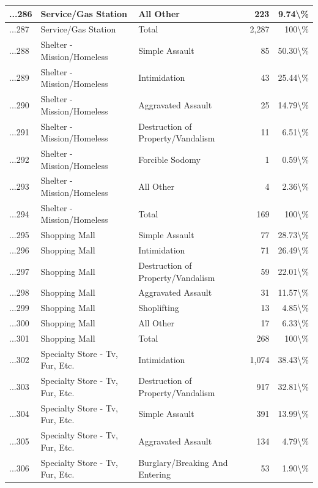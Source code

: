 \documentclass[
]{krantz}
\begin{document}
\begin{longtable}[t]{l|l|l|r|r}
\hline
...286 & Service/Gas Station & All Other & 223 & 9.74\textbackslash{}\%\\
\hline
...287 & Service/Gas Station & Total & 2,287 & 100\textbackslash{}\%\\
\hline
...288 & Shelter - Mission/Homeless & Simple Assault & 85 & 50.30\textbackslash{}\%\\
\hline
...289 & Shelter - Mission/Homeless & Intimidation & 43 & 25.44\textbackslash{}\%\\
\hline
...290 & Shelter - Mission/Homeless & Aggravated Assault & 25 & 14.79\textbackslash{}\%\\
\hline
...291 & Shelter - Mission/Homeless & Destruction of Property/Vandalism & 11 & 6.51\textbackslash{}\%\\
\hline
...292 & Shelter - Mission/Homeless & Forcible Sodomy & 1 & 0.59\textbackslash{}\%\\
\hline
...293 & Shelter - Mission/Homeless & All Other & 4 & 2.36\textbackslash{}\%\\
\hline
...294 & Shelter - Mission/Homeless & Total & 169 & 100\textbackslash{}\%\\
\hline
...295 & Shopping Mall & Simple Assault & 77 & 28.73\textbackslash{}\%\\
\hline
...296 & Shopping Mall & Intimidation & 71 & 26.49\textbackslash{}\%\\
\hline
...297 & Shopping Mall & Destruction of Property/Vandalism & 59 & 22.01\textbackslash{}\%\\
\hline
...298 & Shopping Mall & Aggravated Assault & 31 & 11.57\textbackslash{}\%\\
\hline
...299 & Shopping Mall & Shoplifting & 13 & 4.85\textbackslash{}\%\\
\hline
...300 & Shopping Mall & All Other & 17 & 6.33\textbackslash{}\%\\
\hline
...301 & Shopping Mall & Total & 268 & 100\textbackslash{}\%\\
\hline
...302 & Specialty Store - Tv, Fur, Etc. & Intimidation & 1,074 & 38.43\textbackslash{}\%\\
\hline
...303 & Specialty Store - Tv, Fur, Etc. & Destruction of Property/Vandalism & 917 & 32.81\textbackslash{}\%\\
\hline
...304 & Specialty Store - Tv, Fur, Etc. & Simple Assault & 391 & 13.99\textbackslash{}\%\\
\hline
...305 & Specialty Store - Tv, Fur, Etc. & Aggravated Assault & 134 & 4.79\textbackslash{}\%\\
\hline
...306 & Specialty Store - Tv, Fur, Etc. & Burglary/Breaking And Entering & 53 & 1.90\textbackslash{}\%\\

\end{longtable}
\end{document}

